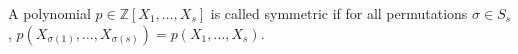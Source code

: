 A polynomial $p \in \mathbb{Z}[X_1, \ldots, X_s]$ is called symmetric if for all permutations $\sigma \in S_s$, $p(X_{\sigma(1)}, \ldots, X_{\sigma(s)}) = p(X_1, \ldots, X_s)$.
